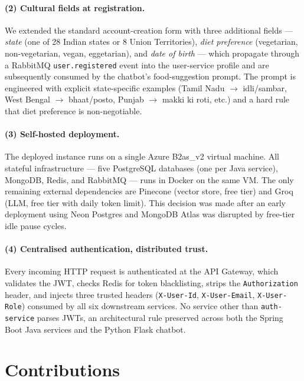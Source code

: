 \documentclass[12pt]{caltech_thesis}
\begin{document}
\paragraph{(2) Cultural fields at registration.} We extended the standard
account-creation form with three additional fields --- \textit{state} (one
of 28 Indian states or 8 Union Territories), \textit{diet preference}
(vegetarian, non-vegetarian, vegan, eggetarian), and \textit{date of birth}
--- which propagate through a RabbitMQ \texttt{user.registered} event into
the user-service profile and are subsequently consumed by the chatbot's
food-suggestion prompt. The prompt is engineered with explicit
state-specific examples (Tamil Nadu $\rightarrow$ idli/sambar, West Bengal
$\rightarrow$ bhaat/posto, Punjab $\rightarrow$ makki ki roti, etc.) and a
hard rule that diet preference is non-negotiable.

\paragraph{(3) Self-hosted deployment.} The deployed instance runs on a
single Azure B2as\_v2 virtual machine. All stateful infrastructure ---
five PostgreSQL databases (one per Java service), MongoDB, Redis, and
RabbitMQ --- runs in Docker on the same VM. The only remaining external
dependencies are Pinecone (vector store, free tier) and Groq (LLM, free
tier with daily token limit). This decision was made after an early
deployment using Neon Postgres and MongoDB Atlas was disrupted by
free-tier idle pause cycles.

\paragraph{(4) Centralised authentication, distributed trust.} Every
incoming HTTP request is authenticated at the API Gateway, which validates
the JWT, checks Redis for token blacklisting, strips the
\texttt{Authorization} header, and injects three trusted headers
(\texttt{X-User-Id}, \texttt{X-User-Email}, \texttt{X-User-Role}) consumed by
all six downstream services. No service other than \texttt{auth-service}
parses JWTs, an architectural rule preserved across both the Spring Boot
Java services and the Python Flask chatbot.

\section{Contributions}
\end{document}
